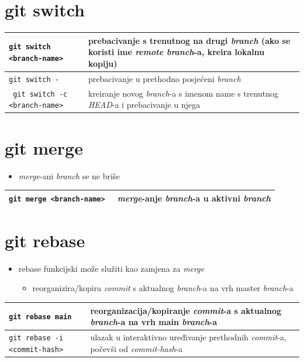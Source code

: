 \documentclass[10pt]{article}
\begin{document}
    \section*{\color{BrickRed} git switch}
    \begin{tabular}{|>{\tt}p{9.00cm}|>{}p{15.50cm}|}
        \hline
        git switch <branch-name>                        & prebacivanje s trenutnog na drugi \textit{branch} (ako se koristi ime \textit{remote branch}-a, kreira lokalnu kopiju) \\ \hline
        git switch -                                    & prebacivanje u prethodno posjećeni \textit{branch} \\ \hline
        git switch -c <branch-name>                     & kreiranje novog \textit{branch}-a s imenom name s trenutnog \textit{HEAD}-a i prebacivanje u njega \\ \hline
    \end{tabular}

    \section*{\color{BrickRed} git merge}
    \begin{itemize}
        \item \textit{merge}-ani \textit{branch} se ne briše
    \end{itemize}
    \begin{tabular}{|>{\tt}p{9.00cm}|>{}p{15.50cm}|}
        \hline
        git merge <branch-name>                         & \textit{merge}-anje \textit{branch}-a u aktivni \textit{branch} \\ \hline
    \end{tabular}

    \section*{\color{BrickRed} git rebase}
    \begin{itemize}
        \item rebase funkcijski može služiti kao zamjena za \textit{merge}
        \begin{itemize}
            \item reorganizira/kopira \textit{commit} s aktualnog \textit{branch}-a na vrh master \textit{branch}-a
        \end{itemize}
    \end{itemize}
    \begin{tabular}{|>{\tt}p{9.00cm}|>{}p{15.50cm}|}
        \hline
        git rebase main                                 & reorganizacija/kopiranje \textit{commit}-a s aktualnog \textit{branch}-a na vrh main \textit{branch}-a \\ \hline
        git rebase -i <commit-hash>                     & ulazak u interaktivno uređivanje prethodnih \textit{commit}-a, počevši od \textit{commit-hash}-a \\ \hline
    \end{tabular}
\end{document}

